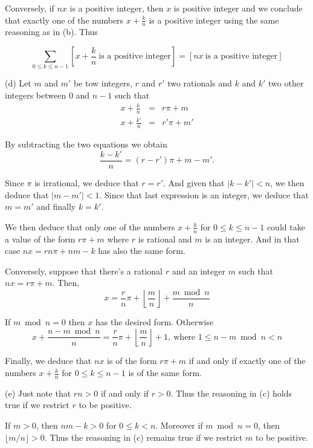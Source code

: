 \documentclass[a4paper,12pt]{article}
\newcommand{\subpar}[1]{\medskip \noindent (#1)}
\begin{document}
Conversely, if $nx$ is a positive integer, then $x$ is positive
integer and we conclude that exactly one of the numbers
$x+\frac{k}{n}$ is a positive integer using the same reasoning as in
(b).  Thus

\[ \sum_{0\le k\le n-1} \left[x+\frac{k}{n}\ \mbox{is a positive
    integer}\right] = [ nx\ \mbox{is a positive integer}]\]

\subpar{d} Let $m$ and $m'$ be tow integers, $r$ and $r'$ two
rationals and $k$ and $k'$ two other integers between $0$ and $n-1$
such that
\begin{eqnarray*}
  x + \frac{k}{n} &=& r\pi + m \\
  x + \frac{k'}{n} &=& r'\pi + m'
\end{eqnarray*}

By subtracting  the two equations we obtain
\[ \frac{k-k'}{n} = (r-r')\pi + m-m'.\]

Since $\pi$ is irrational, we deduce that $r=r'$.  And given that
$|k-k'| < n$, we then deduce that $|m - m'| < 1$.  Since that last
expression is an integer, we deduce that $m = m'$ and finally $k=k'$.

We then deduce that only one of the numbers $x + \frac{k}{n}$ for
$0\le k\le n-1$ could take a value of the form $r \pi + m$ where $r$
is rational and $m$ is an integer.  And in that case $n x = rn \pi +
nm-k$ has also the same form.

Conversely, suppose that there's a rational $r$ and an integer $m$
such that $nx = r\pi + m$.  Then,
\[ x = \frac{r}{n} \pi + \left\lfloor \frac{m}{n}\right\rfloor +
\frac{m\bmod n}{n}\]

If $m\bmod n = 0$ then $x$ has the desired form.  Otherwise
\[ x + \frac{n-m \bmod n}{n} = \frac{r}{n} \pi + \left\lfloor
\frac{m}{n}\right\rfloor + 1,\ \mbox{where $1\le n - m \bmod n<n$}\]

Finally, we deduce that $nx$ is of the form $r\pi + m$ if and only if
exactly one of the numbers $x + \frac{k}{n}$ for $0\le k \le n-1$ is
of the same form.

\subpar{e}  Just note that $rn > 0$ if and only if $r > 0$.  Thus the
reasoning in (c) holds true if we restrict $r$ to be positive.

If $m>0$, then $nm-k>0$ for $0\le k<n$.  Moreover if $m \bmod n = 0$,
then $\lfloor m/n\rfloor > 0$.  Thus the reasoning in (c) remains true
if we restrict $m$ to be positive.
\end{document}
